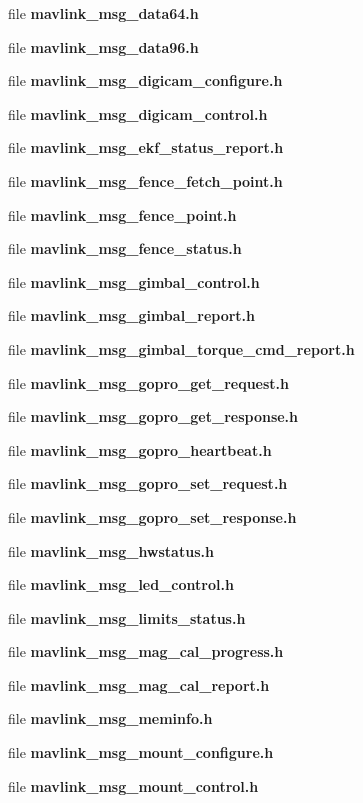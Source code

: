 \begin{DoxyCompactItemize}
\item 
file \textbf{ mavlink\+\_\+msg\+\_\+data64.\+h}
\item 
file \textbf{ mavlink\+\_\+msg\+\_\+data96.\+h}
\item 
file \textbf{ mavlink\+\_\+msg\+\_\+digicam\+\_\+configure.\+h}
\item 
file \textbf{ mavlink\+\_\+msg\+\_\+digicam\+\_\+control.\+h}
\item 
file \textbf{ mavlink\+\_\+msg\+\_\+ekf\+\_\+status\+\_\+report.\+h}
\item 
file \textbf{ mavlink\+\_\+msg\+\_\+fence\+\_\+fetch\+\_\+point.\+h}
\item 
file \textbf{ mavlink\+\_\+msg\+\_\+fence\+\_\+point.\+h}
\item 
file \textbf{ mavlink\+\_\+msg\+\_\+fence\+\_\+status.\+h}
\item 
file \textbf{ mavlink\+\_\+msg\+\_\+gimbal\+\_\+control.\+h}
\item 
file \textbf{ mavlink\+\_\+msg\+\_\+gimbal\+\_\+report.\+h}
\item 
file \textbf{ mavlink\+\_\+msg\+\_\+gimbal\+\_\+torque\+\_\+cmd\+\_\+report.\+h}
\item 
file \textbf{ mavlink\+\_\+msg\+\_\+gopro\+\_\+get\+\_\+request.\+h}
\item 
file \textbf{ mavlink\+\_\+msg\+\_\+gopro\+\_\+get\+\_\+response.\+h}
\item 
file \textbf{ mavlink\+\_\+msg\+\_\+gopro\+\_\+heartbeat.\+h}
\item 
file \textbf{ mavlink\+\_\+msg\+\_\+gopro\+\_\+set\+\_\+request.\+h}
\item 
file \textbf{ mavlink\+\_\+msg\+\_\+gopro\+\_\+set\+\_\+response.\+h}
\item 
file \textbf{ mavlink\+\_\+msg\+\_\+hwstatus.\+h}
\item 
file \textbf{ mavlink\+\_\+msg\+\_\+led\+\_\+control.\+h}
\item 
file \textbf{ mavlink\+\_\+msg\+\_\+limits\+\_\+status.\+h}
\item 
file \textbf{ mavlink\+\_\+msg\+\_\+mag\+\_\+cal\+\_\+progress.\+h}
\item 
file \textbf{ mavlink\+\_\+msg\+\_\+mag\+\_\+cal\+\_\+report.\+h}
\item 
file \textbf{ mavlink\+\_\+msg\+\_\+meminfo.\+h}
\item 
file \textbf{ mavlink\+\_\+msg\+\_\+mount\+\_\+configure.\+h}
\item 
file \textbf{ mavlink\+\_\+msg\+\_\+mount\+\_\+control.\+h}

\end{DoxyCompactItemize}
